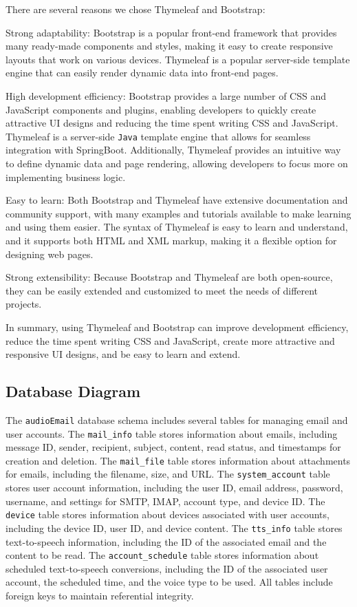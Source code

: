 \documentclass{article}
\begin{document}
There are several reasons we chose Thymeleaf and Bootstrap:


Strong adaptability: Bootstrap is a popular front-end framework that provides many ready-made components and styles, making it easy to create responsive layouts that work on various devices. Thymeleaf is a popular server-side template engine that can easily render dynamic data into front-end pages.

High development efficiency: Bootstrap provides a large number of CSS and JavaScript components and plugins, enabling developers to quickly create attractive UI designs and reducing the time spent writing CSS and JavaScript. Thymeleaf is a server-side \texttt{Java} template engine that allows for seamless integration with SpringBoot. Additionally, Thymeleaf provides an intuitive way to define dynamic data and page rendering, allowing developers to focus more on implementing business logic.

Easy to learn: Both Bootstrap and Thymeleaf have extensive documentation and community support, with many examples and tutorials available to make learning and using them easier. The syntax of Thymeleaf is easy to learn and understand, and it supports both HTML and XML markup, making it a flexible option for designing web pages.

Strong extensibility: Because Bootstrap and Thymeleaf are both open-source, they can be easily extended and customized to meet the needs of different projects.

In summary, using Thymeleaf and Bootstrap can improve development efficiency, reduce the time spent writing CSS and JavaScript, create more attractive and responsive UI designs, and be easy to learn and extend.


\subsection{Database Diagram}
The \texttt{audioEmail} database schema includes several tables for managing email and user accounts. The \texttt{mail\_info} table stores information about emails, including message ID, sender, recipient, subject, content, read status, and timestamps for creation and deletion. The \texttt{mail\_file} table stores information about attachments for emails, including the filename, size, and URL. The \texttt{system\_account} table stores user account information, including the user ID, email address, password, username, and settings for SMTP, IMAP, account type, and device ID. The \texttt{device} table stores information about devices associated with user accounts, including the device ID, user ID, and device content. The \texttt{tts\_info} table stores text-to-speech information, including the ID of the associated email and the content to be read. The \texttt{account\_schedule} table stores information about scheduled text-to-speech conversions, including the ID of the associated user account, the scheduled time, and the voice type to be used. All tables include foreign keys to maintain referential integrity.
\end{document}
